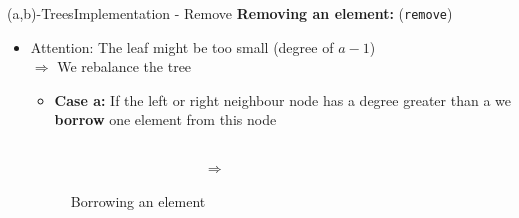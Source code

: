 
\begin{frame}{(a,b)-Trees}{Implementation - Remove}
  \textbf{Removing an element:} (\texttt{\color{Mittel-Blau}remove})
  \begin{itemize}
    \item<2->
      {\color{cyan}Attention:} The leaf might be too small (degree of {\color{Mittel-Blau}$a-1$})\\
      $\Rightarrow$ We {\color{Mittel-Blau}rebalance} the tree
      \vspace{0.5em}
      \begin{itemize}
        \item<3->
        \textbf{Case a:}
        If the left or right neighbour node has a degree greater than
        {\color{Mittel-Blau}a} we \textbf{borrow} one element from this node
      \end{itemize}
      \begin{figure}
        \begin{columns}
          \begin{column}{0.45\linewidth}
            \begin{adjustbox}{width=\linewidth}
              
            \end{adjustbox}
          \end{column}
          \begin{column}{0.1\linewidth}
            \begin{center}
              $\Rightarrow$
            \end{center}
          \end{column}
          \begin{column}{0.45\linewidth}
            \begin{adjustbox}{width=\linewidth}
              
            \end{adjustbox}
          \end{column}
        \end{columns}
        \caption{Borrowing an element}
        \label{fig:a_b_tree:move}
      \end{figure}
  \end{itemize}
\end{frame}


